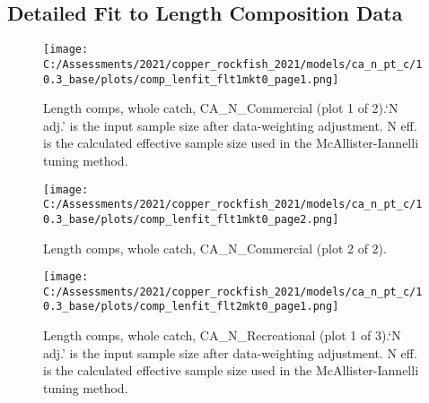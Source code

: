 \documentclass[11pt,
  english,
  a4paper,
]{article}
\begin{document}
\tagmcend\tagstructend

\newpage


\hypertarget{append-fit}{%
\subsection{Detailed Fit to Length Composition Data}\label{append-fit}}

\leavevmode\tagmcend\tagstructend


\begin{figure}
\centering
\texttt{[image: C:/Assessments/2021/copper\_rockfish\_2021/models/ca\_n\_pt\_c/10.3\_base/plots/comp\_lenfit\_flt1mkt0\_page1.png]}
\caption{Length comps, whole catch, CA\_N\_Commercial (plot 1 of 2).`N adj.' is the input sample size after data-weighting adjustment. N eff. is the calculated effective sample size used in the McAllister-Iannelli tuning method.\label{fig:comp_lenfit_flt1mkt0_page1}}
\end{figure}

\tagmcend\tagstructend


\begin{figure}
\centering
\texttt{[image: C:/Assessments/2021/copper\_rockfish\_2021/models/ca\_n\_pt\_c/10.3\_base/plots/comp\_lenfit\_flt1mkt0\_page2.png]}
\caption{Length comps, whole catch, CA\_N\_Commercial (plot 2 of 2).\label{fig:comp_lenfit_flt1mkt0_page2}}
\end{figure}

\tagmcend\tagstructend


\begin{figure}
\centering
\texttt{[image: C:/Assessments/2021/copper\_rockfish\_2021/models/ca\_n\_pt\_c/10.3\_base/plots/comp\_lenfit\_flt2mkt0\_page1.png]}
\caption{Length comps, whole catch, CA\_N\_Recreational (plot 1 of 3).`N adj.' is the input sample size after data-weighting adjustment. N eff. is the calculated effective sample size used in the McAllister-Iannelli tuning method.\label{fig:comp_lenfit_flt2mkt0_page1}}
\end{figure}
\end{document}
